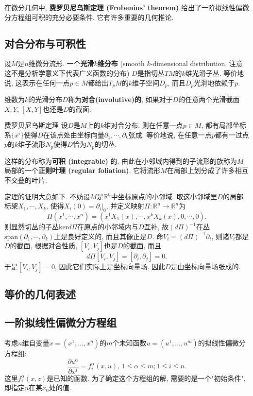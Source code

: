 
在微分几何中, \textbf{费罗贝尼乌斯定理 (Frobenius' theorem)} 给出了一阶拟线性偏微分方程组可积的充分必要条件. 它有许多重要的几何推论.

\subsection{对合分布与可积性}
设$M$是$n$维微分流形. 一个\textbf{光滑$k$维分布} (smooth $k$-dimensional distribution, 注意这不是分析学意义下代表广义函数的分布) $D$是指切丛$TM$的$k$维光滑子丛. 等价地说, 这表示在任何一点$p\in M$都给出$T_pM$的$k$维子空间$D_p$, 而且$D_p$光滑地依赖于$p$. 

维数为$k$的光滑分布$D$称为\textbf{对合(involutive)的}, 如果对于$D$的任意两个光滑截面$X,Y$, $[X,Y]$也还是$D$的截面. 

\begin{theorem}{费罗贝尼乌斯定理}
设$D$是$M$上的$k$维对合分布. 则在任意一点$p\in M$, 都有局部坐标系$\{x^i\}$使得$D$在该点处由坐标向量$\partial_1,\cdots ,\partial_k$张成. 等价地说, 在任意一点$p$都有一过点$p$的$k$维子流形$N_p$使得$D$恰为$N_p$的切丛.
\end{theorem}
这样的分布称为\textbf{可积 (integrable)} 的. 由此在小邻域内得到的子流形的族称为$M$局部的一个\textbf{正则叶理 (regular foliation)}. 它将流形$M$在局部上划分成了许多相互不交叠的叶片.

定理的证明大意如下. 不妨设$M$是$\mathbb{R}^n$中坐标原点的小邻域. 取这小邻域里$D$的局部标架$X_1,\cdots ,X_k$, 使得$X_i(0)=\partial_i|_0$, 并定义映射$\Pi: \mathbb{R}^n\to \mathbb{R}^n$为
$$
\Pi(x^1,\cdots ,x^n)=(x^1X_1(x),\cdots ,x^kX_k(x),0,\cdots ,0).
$$
则显然切丛的子丛$\text{ker}d\Pi$在原点的小邻域内与$D$互补, 故$(d\Pi)^{-1}$在丛$\text{span}(\partial_1,\cdots ,\partial_k)$上是良好定义的, 而且其像正是$D$. 命$V_i=(d\Pi)^{-1}\partial_i$, 则诸$V_i$都是$D$的截面, 根据对合性质, $[V_i,V_j]$也是$D$的截面, 而且
$$
d\Pi[V_i,V_j]=[\partial_i,\partial_j]=0.
$$
于是$[V_i,V_j]=0$, 因此它们实际上是坐标向量场. 因此$D$是由坐标向量场张成的. 

\subsection{等价的几何表述}


\subsection{一阶拟线性偏微分方程组}
考虑$n$维自变量$x=(x^1,...,x^n)$的$m$个未知函数$u=(u^1,...,u^m)$的拟线性偏微分方程组:
$$
\frac{\partial u^\alpha}{\partial x^i}=f_i^\alpha(x,u),\,1\leq\alpha\leq m;1\leq i\leq n.
$$
这里$f_i^\alpha(x,z)$是已知的函数. 为了确定这个方程组的解, 需要的是一个"初始条件", 即指定$u$在某$x_0$处的值. 